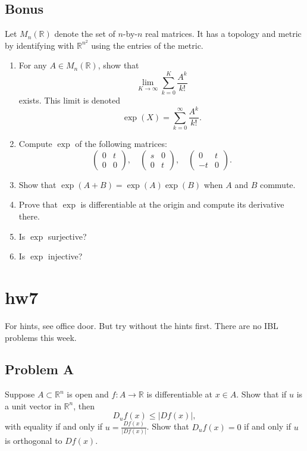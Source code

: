 \documentclass[lang=en,11pt]{template}
\begin{document}
\section*{Bonus}
Let $M_n(\mathbb{R})$ denote the set of $n$-by-$n$ real matrices. It has a topology and metric by identifying with $\mathbb{R}^{n^2}$ using the entries of the metric.
\begin{enumerate}
    \item For any $A \in M_n(\mathbb{R})$, show that
    \[
    \lim_{K \to \infty} \sum_{k=0}^K \frac{A^k}{k!}
    \]
    exists. This limit is denoted
    \[
    \exp(X) = \sum_{k=0}^\infty \frac{A^k}{k!}.
    \]
    \item Compute $\exp$ of the following matrices:
    \[
    \begin{pmatrix} 0 & t \\ 0 & 0 \end{pmatrix}, \quad \begin{pmatrix} s & 0 \\ 0 & t \end{pmatrix}, \quad \begin{pmatrix} 0 & t \\ -t & 0 \end{pmatrix}.
    \]
    \item Show that $\exp(A + B) = \exp(A)\exp(B)$ when $A$ and $B$ commute.
    \item Prove that $\exp$ is differentiable at the origin and compute its derivative there.
    \item Is $\exp$ surjective?
    \item Is $\exp$ injective?
\end{enumerate}

\chapter{hw7}

For hints, see office door. But try without the hints first. There are no IBL problems this week.

\section*{Problem A}
Suppose $A \subset \mathbb{R}^n$ is open and $f : A \to \mathbb{R}$ is differentiable at $x \in A$. Show that if $u$ is a unit vector in $\mathbb{R}^n$, then
\[
D_u f(x) \leq |Df(x)|,
\]
with equality if and only if $u = \frac{Df(x)}{|Df(x)|}$. Show that $D_u f(x) = 0$ if and only if $u$ is orthogonal to $Df(x)$.
\end{document}
